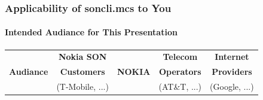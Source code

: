 \begin{verblatex}

\begin{frame}[fragile,plain,label=intendedAudiance]
    \frametitle{Applicability of soncli.mcs to You}
    \framesubtitle{Intended Audiance for This Presentation}

\begin{small}
\begin{tabular}{|p{1in}|p{2in}|p{1.5in}|p{2in}|p{1.5in}|}
\hline
    \multicolumn{1}{|c|}{{\color{darkblue} \textbf{}}} &
    \multicolumn{1}{c|}{{\color{magenta} \textbf{Nokia SON}}} &
    \multicolumn{1}{c|}{{\color{purple} \textbf{}}} &
    \multicolumn{1}{c|}{{\color{teal} \textbf{Telecom}}} &
    \multicolumn{1}{c|}{{\color{darkred} \textbf{{Internet}}}} \\
    \multicolumn{1}{|c|}{{\color{blue} \textbf{Audiance}}} &
    \multicolumn{1}{c|}{{\color{magenta} \textbf{Customers}}} &
    \multicolumn{1}{c|}{{\color{blue} \textbf{NOKIA}}} &
    \multicolumn{1}{c|}{{\color{teal} \textbf{Operators}}} &
    \multicolumn{1}{c|}{{\color{darkred} \textbf{{Providers}}}} \\
      \multicolumn{1}{|c|}{{\color{blue} \textbf{}}} &
    \multicolumn{1}{c|}{{\color{magenta} (T-Mobile, ...)}} &
    \multicolumn{1}{c|}{{\color{purple} \textbf{}}} &
    \multicolumn{1}{c|}{{\color{teal} (AT\&T, ...)}} &
    \multicolumn{1}{c|}{{\color{darkred} {(Google, ...)}}} \\


\end{tabular}
\end{small}
\end{frame}
\end{verblatex}
